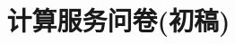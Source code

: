 
\title{{\heiti 计算服务问卷}(初稿)}%
\author[ ]{}   %
\date{} %


\maketitle
\thispagestyle{fancy}   %
\vspace{-1in}
